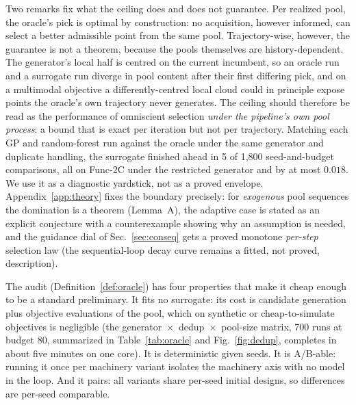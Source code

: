 \documentclass[%
 aip,
 amsmath,amssymb,
 floatfix,
 reprint,%
]{revtex4-1}
\begin{document}
Two remarks fix what the ceiling does and does not guarantee. Per realized pool,
the oracle's pick is optimal by construction: no acquisition, however
informed, can select a better admissible point from the same pool.
Trajectory-wise, however, the guarantee is not a theorem, because the
pools themselves are history-dependent. The generator's local half is
centred on the current incumbent, so an oracle run and a surrogate run
diverge in pool content after their first differing pick, and on a
multimodal objective a differently-centred local cloud could in
principle expose points the oracle's own trajectory never generates. The
ceiling should therefore be read as the performance of omniscient
selection \emph{under the pipeline's own pool process}: a bound that is
exact per iteration but not per trajectory. Matching each GP and
random-forest run against the oracle under the same generator and
duplicate handling, the surrogate finished ahead in 5 of 1{,}800
seed-and-budget comparisons, all on Func-2C under the restricted
generator and by at most $0.018$. We
use it as a diagnostic yardstick, not as a proved envelope.
Appendix~\ref{app:theory} fixes the boundary precisely: for
\emph{exogenous} pool sequences the domination is a theorem (Lemma~A),
the adaptive case is stated as an explicit conjecture with a
counterexample showing why an assumption is needed, and the guidance
dial of Sec.~\ref{sec:conseq} gets a proved monotone \emph{per-step}
selection law (the sequential-loop decay curve remains a fitted, not
proved, description).

The audit (Definition~\ref{def:oracle}) has four properties that make it
cheap enough to be a standard
preliminary. It fits no surrogate: its cost is candidate generation
plus objective evaluations of the pool, which on synthetic or
cheap-to-simulate objectives is negligible (the
generator~$\times$~dedup~$\times$~pool-size matrix, 700
runs at budget 80, summarized in Table~\ref{tab:oracle} and
Fig.~\ref{fig:dedup}, completes in about five minutes on one core). It is
deterministic given seeds. It is A/B-able: running it once per machinery
variant isolates the machinery axis with no model in the loop. And it
pairs: all variants share per-seed initial designs, so differences are
per-seed comparable.
\end{document}
